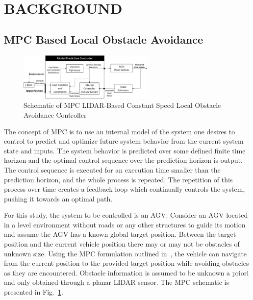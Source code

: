 \documentclass[12pt,twocolumn]{article}
\begin{document}

\section{BACKGROUND}\label{s:background}

\subsection{MPC Based Local Obstacle Avoidance }\label{MPC}

\begin{figure}
	\centering
	\includegraphics[width=0.6\textwidth]{Figs/MPCBlockDiagram.png}
	\caption{{\small Schematic of MPC LIDAR-Based Constant Speed Local Obstacle Avoidance Controller}}    
	\label{fig:MPC_schematic}
\end{figure}

The concept of MPC is to use an internal model of the system one desires to control to predict and optimize future system behavior from the current system state and inputs. The system behavior is predicted over some defined finite time horizon and the optimal control sequence over the prediction horizon is output. The control sequence is executed for an execution time smaller than the prediction horizon, and the whole process is repeated. The repetition of this process over time creates a feedback loop which continually controls the system, pushing it towards an optimal path.

For this study, the system to be controlled is an AGV. Consider an AGV located in a level environment without roads or any other structures to guide its motion and assume the AGV has a known global target position. Between the target position and the current vehicle position there may or may not be obstacles of unknown size. Using the MPC formulation outlined in~\cite{ModelFidelity2016}, the vehicle can navigate from the current position to the provided target position while avoiding obstacles as they are encountered. Obstacle information is assumed to be unknown a priori and only obtained through a planar LIDAR sensor. The MPC schematic is presented in Fig.~\ref{fig:MPC_schematic}.
%
\end{document}
